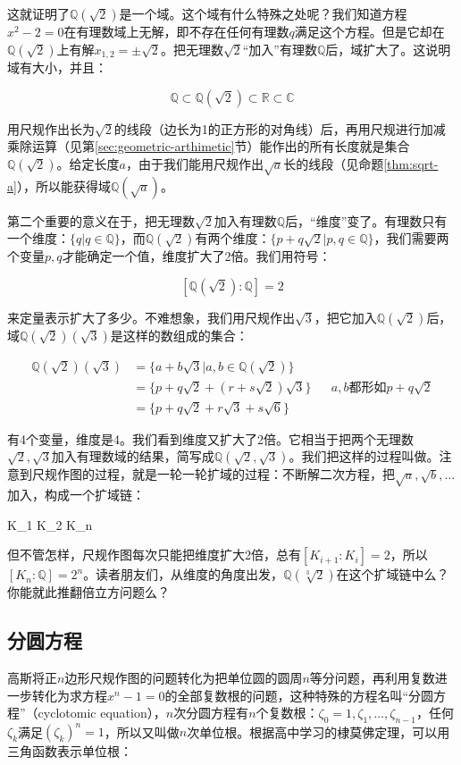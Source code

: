 这就证明了$\mathbb{Q}(\sqrt{2})$是一个域。这个域有什么特殊之处呢？我们知道方程$x^2 - 2 = 0$在有理数域上无解，即不存在任何有理数$q$满足这个方程。但是它却在$\mathbb{Q}(\sqrt{2})$上有解$x_{1, 2} = \pm \sqrt{2}$。把无理数$\sqrt{2}$“加入”有理数$\mathbb{Q}$后，域扩大了。这说明域有大小，并且：

\[
\mathbb{Q} \subset \mathbb{Q}(\sqrt{2}) \subset \mathbb{R} \subset \mathbb{C}
\]

用尺规作出长为$\sqrt{2}$的线段（边长为1的正方形的对角线）后，再用尺规进行加减乘除运算（见第\ref{sec:geometric-arthimetic}节）能作出的所有长度就是集合$\mathbb{Q}(\sqrt{2})$。给定长度$a$，由于我们能用尺规作出$\sqrt{a}$长的线段（见命题\ref{thm:sqrt-a}），所以能获得域$\mathbb{Q}(\sqrt{a})$。

第二个重要的意义在于，把无理数$\sqrt{2}$加入有理数$\mathbb{Q}$后，“维度”变了。有理数只有一个维度：$\{q | q \in \mathbb{Q}\}$，而$\mathbb{Q}(\sqrt{2})$有两个维度：$\{p + q \sqrt{2} | p, q \in \mathbb{Q}\}$，我们需要两个变量$p, q$才能确定一个值，维度扩大了2倍。我们用符号：

\[
[\mathbb{Q}(\sqrt{2}) : \mathbb{Q}] = 2
\]

来定量表示扩大了多少。不难想象，我们用尺规作出$\sqrt{3}$，把它加入$\mathbb{Q}(\sqrt{2})$后，域$\mathbb{Q}(\sqrt{2})(\sqrt{3})$是这样的数组成的集合：

\begin{align*}
  \mathbb{Q}(\sqrt{2})(\sqrt{3}) &= \{a + b \sqrt{3} | a, b \in \mathbb{Q}(\sqrt{2}) \} \\
  &= \{p + q \sqrt{2} + (r + s\sqrt{2})\sqrt{3} \} && a, b \text{都形如} p + q\sqrt{2} \\
  &= \{p + q \sqrt{2} + r\sqrt{3} + s\sqrt{6} \}
\end{align*}

有4个变量，维度是4。我们看到维度又扩大了2倍。它相当于把两个无理数$\sqrt{2}, \sqrt{3}$加入有理数域的结果，简写成$\mathbb{Q}(\sqrt{2}, \sqrt{3})$。我们把这样的过程叫做。注意到尺规作图的过程，就是一轮一轮扩域的过程：不断解二次方程，把$\sqrt{a}, \sqrt{b}, \dotsc$加入，构成一个扩域链：

\be
{} \subset K_1 \subset K_2 \subset \dotsb \subset K_n
\label{eq:tower-of-geometric-field-ext}
\ee

但不管怎样，尺规作图每次只能把维度扩大2倍，总有$[K_{i+1} : K_i] = 2$，所以$[K_n : \mathbb{Q}] = 2^n$。读者朋友们，从维度的角度出发，$\mathbb{Q}(\sqrt[3]{2})$在这个扩域链中么？你能就此推翻倍立方问题么？

\subsection{分圆方程}
高斯将正$n$边形尺规作图的问题转化为把单位圆的圆周$n$等分问题，再利用复数进一步转化为求方程$x^n - 1 = 0$的全部复数根的问题，这种特殊的方程名叫“分圆方程”（cyclotomic equation），$n$次分圆方程有$n$个复数根：$\zeta_0 = 1, \zeta_1, \dotsc, \zeta_{n-1}$，任何$\zeta_k$满足$(\zeta_k)^n = 1$，所以又叫做$n$次单位根。根据高中学习的棣莫佛定理，可以用三角函数表示单位根：

